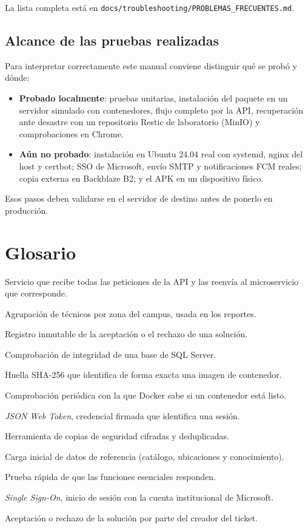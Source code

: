 \documentclass[11pt,a4paper,oneside]{report}
\DeclareRobustCommand{\ruta}[1]{{\small\nolinkurl{#1}}}
\begin{document}
La lista completa está en \ruta{docs/troubleshooting/PROBLEMAS_FRECUENTES.md}.

\section{Alcance de las pruebas realizadas}
Para interpretar correctamente este manual conviene distinguir qué se probó y dónde:
\begin{itemize}
  \item \textbf{Probado localmente}: pruebas unitarias, instalación del paquete en un servidor simulado
        con contenedores, flujo completo por la API, recuperación ante desastre con un repositorio
        Restic de laboratorio (MinIO) y comprobaciones en Chrome.
  \item \textbf{Aún no probado}: instalación en Ubuntu 24.04 real con systemd, nginx del host y certbot;
        SSO de Microsoft, envío SMTP y notificaciones FCM reales; copia externa en Backblaze B2;
        y el APK en un dispositivo físico.
\end{itemize}
Esos pasos deben validarse en el servidor de destino antes de ponerlo en producción.

\appendix
\chapter{Glosario}
\begin{description}[style=nextline,leftmargin=1.2cm]
  \item[API Gateway] Servicio que recibe todas las peticiones de la API y las reenvía al microservicio que corresponde.
  \item[Bloque] Agrupación de técnicos por zona del campus, usada en los reportes.
  \item[Constancia] Registro inmutable de la aceptación o el rechazo de una solución.
  \item[DBCC CHECKDB] Comprobación de integridad de una base de SQL Server.
  \item[Digest] Huella SHA-256 que identifica de forma exacta una imagen de contenedor.
  \item[Healthcheck] Comprobación periódica con la que Docker sabe si un contenedor está listo.
  \item[JWT] \emph{JSON Web Token}, credencial firmada que identifica una sesión.
  \item[Restic] Herramienta de copias de seguridad cifradas y deduplicadas.
  \item[Seed] Carga inicial de datos de referencia (catálogo, ubicaciones y conocimiento).
  \item[Smoke test] Prueba rápida de que las funciones esenciales responden.
  \item[SSO] \emph{Single Sign-On}, inicio de sesión con la cuenta institucional de Microsoft.
  \item[Validación digital] Aceptación o rechazo de la solución por parte del creador del ticket.
\end{description}
\end{document}
